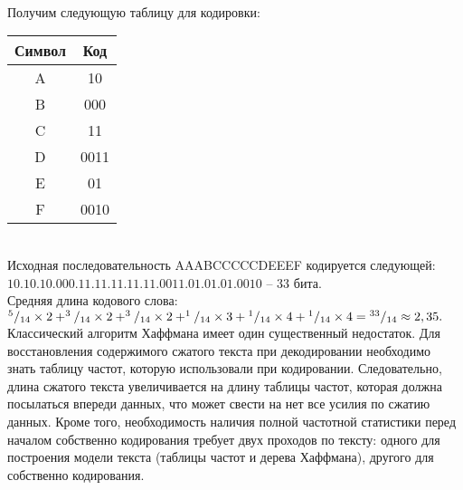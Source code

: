 \\
\\
\\Получим следующую таблицу для кодировки:
\begin{table}[h]
\begin{tabular}{|c|c|}
\hline
Символ &  Код \\
\hline
A & 10 \\
B & 000 \\
C & 11 \\
D & 0011 \\
E & 01 \\
F & 0010 \\
\hline
\end{tabular}
\end{table}
\\Исходная последовательность AAABCCCCCDEEEF кодируется следующей: $10.10.10.000.11.11.11.11.11.0011.01.01.01.0010$ -- 33 бита.
\\Средняя длина кодового слова: $^5/_{14}\times 2 + ^3/_{14}\times 2 + ^3/_{14}\times 2 + ^1/_{14}\times 3\hm + ^1/_{14}\hm\times 4\hm + ^1/_{14}\hm\times 4\hm = ^{33}/_{14} \approx 2,35.$
Классический алгоритм Хаффмана имеет один существенный недостаток. Для восстановления содержимого сжатого текста при декодировании необходимо знать таблицу частот, которую использовали при кодировании. Следовательно, длина сжатого текста увеличивается на длину таблицы частот, которая должна посылаться впереди данных, что может свести на нет все усилия по сжатию данных. Кроме того, необходимость наличия полной частотной статистики перед началом собственно кодирования требует двух проходов по тексту: одного для построения модели текста (таблицы частот и дерева Хаффмана), другого для собственно кодирования.\\

